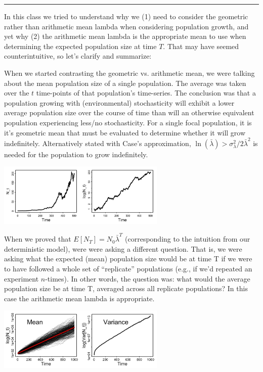 \documentclass{article}
\begin{document}
\noindent{}

\rule[0.5ex]{\linewidth}{1pt}
In this class we tried to understand why we (1) need to consider the geometric rather than arithmetic mean lambda when considering population growth, and yet why (2) the arithmetic mean lambda is the appropriate mean to use when determining the expected population size at time $T$.  That may have seemed counterintuitive, so let's clarify and summarize:

When we started contrasting the geometric vs. arithmetic mean, we were talking about the
mean population size of a single population. The average was taken over the $t$ time-points of that population's time-series. The conclusion was that a population growing with (environmental) stochasticity will exhibit a lower average population size over the course of time than will an otherwise equivalent population experiencing less/no stochasticity. For a single focal population, it is it's geometric mean that must be evaluated to determine whether it will grow indefinitely. Alternatively
stated with Case's approximation, $\ln (\bar{\lambda}) > \sigma_{\lambda}^2 / 2 \bar{\lambda}^2$ is needed for the population to grow indefinitely.

\begin{center}
\includegraphics[width=8cm]{figs/image0}
\end{center}

When we proved that $E[N_T]=N_0 \bar{\lambda}^T$ (corresponding to the intuition from our deterministic model), were were asking a different question. That is, we were asking what the expected (mean) population size would be at time T if we were to have followed a whole set of ``replicate'' populations (e.g., if we'd repeated an experiment $n$-times). In other words, the question was: what would the average population size be at time T, averaged across all replicate populations? In this case the arithmetic mean lambda is appropriate.

\begin{center}
 \includegraphics[width=8cm]{figs/image2}
\end{center}
\end{document}
